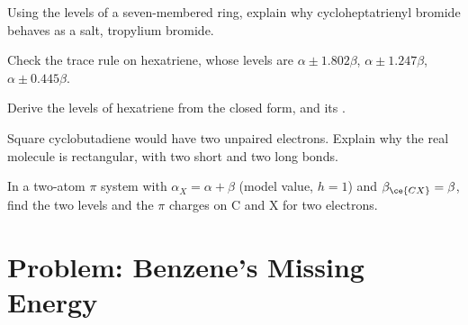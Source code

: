 \begin{exercise}[$\star\star$]\label{exo:b2:huckel:8}
Using the levels of a seven-membered ring, explain why cycloheptatrienyl bromide
behaves as a salt, tropylium bromide.
\end{exercise}

\begin{exercise}[$\star\star$]\label{exo:b2:huckel:9}
Check the trace rule on hexatriene, whose levels are $\alpha \pm 1.802\beta$, $\alpha \pm
1.247\beta$, $\alpha \pm 0.445\beta$.
\end{exercise}

\begin{exercise}[$\star\star\star$]\label{exo:b2:huckel:10}
Derive the levels of hexatriene from the closed form, and its .
\end{exercise}

\begin{exercise}[$\star\star\star$]\label{exo:b2:huckel:11}
Square cyclobutadiene would have two unpaired electrons. Explain why the real molecule
is rectangular, with two short and two long bonds.
\end{exercise}

\begin{exercise}[$\star\star\star$]\label{exo:b2:huckel:12}
In a two-atom $\pi$ system  with $\alpha_X = \alpha + \beta$ (model value, $h = 1$) and
$\beta_{\ce{CX}} = \beta$, find the two levels and the $\pi$ charges on C and X for two
electrons.
\end{exercise}

\section{Problem: Benzene's Missing Energy}

